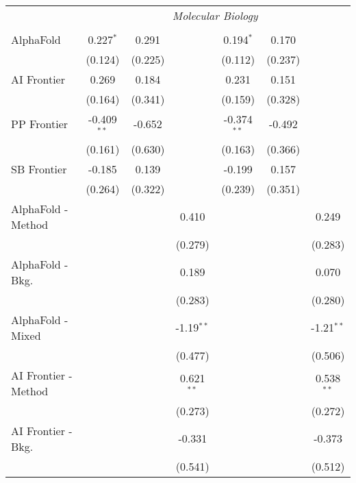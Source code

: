 \begin{tabular}{lcccccc}
 & \multicolumn{6}{c}{\textit{Molecular Biology}} \\ \\
   AlphaFold            & 0.227$^{*}$   & 0.291   &              & 0.194$^{*}$   & 0.170   &   \\   
                        & (0.124)       & (0.225) &              & (0.112)       & (0.237) &   \\   
   AI Frontier          & 0.269         & 0.184   &              & 0.231         & 0.151   &   \\   
                        & (0.164)       & (0.341) &              & (0.159)       & (0.328) &   \\   
   PP Frontier          & -0.409$^{**}$ & -0.652  &              & -0.374$^{**}$ & -0.492  &   \\   
                        & (0.161)       & (0.630) &              & (0.163)       & (0.366) &   \\   
   SB Frontier          & -0.185        & 0.139   &              & -0.199        & 0.157   &   \\   
                        & (0.264)       & (0.322) &              & (0.239)       & (0.351) &   \\   
   AlphaFold - Method   &               &         & 0.410        &               &         & 0.249\\   
                        &               &         & (0.279)      &               &         & (0.283)\\   
   AlphaFold - Bkg.     &               &         & 0.189        &               &         & 0.070\\   
                        &               &         & (0.283)      &               &         & (0.280)\\   
   AlphaFold - Mixed    &               &         & -1.19$^{**}$ &               &         & -1.21$^{**}$\\   
                        &               &         & (0.477)      &               &         & (0.506)\\   
   AI Frontier - Method &               &         & 0.621$^{**}$ &               &         & 0.538$^{**}$\\   
                        &               &         & (0.273)      &               &         & (0.272)\\   
   AI Frontier - Bkg.   &               &         & -0.331       &               &         & -0.373\\   
                        &               &         & (0.541)      &               &         & (0.512)\\   

\end{tabular}
